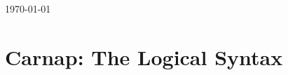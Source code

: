 \documentclass[12pt,twoside,letterpaper]{article}
\theoremstyle{plain}
\numberwithin{equation}{section}
\theoremstyle{definition}
\newtheorem{phrase string}{Phrase String}
\begin{document}
\today




\section{Carnap: The Logical Syntax}
\section{}
\section{}






\end{document}
